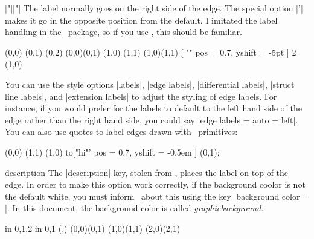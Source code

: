\begin{sseqdata}[name = basic, cohomological Serre grading]
\begin{manualentry}{|"||"|}
The label normally goes on the right side of the edge. The special option |'|
makes it go in the opposite position from the default. I imitated the label
handling in the \tikzcdpkg\ package, so if you use \tikzcdpkg, this should be
familiar.
\begin{codeexample}[width = 6cm]
\begin{sseqpage}[ Adams grading, yscale = 0.63 ]
\class(0,0)
\class(0,1)
\class(0,2)
\structline["a"' blue](0,0)(0,1)
\class(1,0)
\class(1,1)
\structline["b"](1,0)(1,1)
\d[ "" { pos = 0.7, yshift = -5pt } ] 2 (1,0)
\end{sseqpage}
\end{codeexample}
You can use the style options |labels|, |edge labels|, |differential labels|,
|struct line labels|, and |extension labels| to adjust the styling of edge labels. For instance, if
you would prefer for the labels to default to the left hand side of the edge
rather than the right hand side, you could say |edge labels = {auto = left}|.
You can also use quotes to label edges drawn with \tikzpkg\ primitives:
\begin{codeexample}[width = 6cm]
\begin{sseqpage}[ yscale = 0.58, no axes ]
\class(0,0)
\class(1,1)
\draw (1,0) to["hi"'{ pos = 0.7, yshift = -0.5em }] (0,1);
\end{sseqpage}
\end{codeexample}

\begin{key}{description}
The |description| key, stolen from \tikzcdpkg, places the label on top of the
edge. In order to make this option work correctly, if the background coolor is
not the default white, you must inform \sseqpages\ about this using the key
|background color = |. In this document, the background color is
called \textit{graphicbackground}.
\begin{codeexample}[width = 6cm]
\begin{sseqpage}[ no axes, background color = graphicbackground ]
\foreach \x in {0,1,2} \foreach \y in {0,1} {
    \class(\x,\y)
}
\structline["a" red](0,0)(0,1)
\structline["a'"'blue,"b"{yshift = 1em}](1,0)(1,1)
\structline["c" description](2,0)(2,1)
\end{sseqpage}
\end{codeexample}
\end{key}
\end{manualentry}




\end{sseqdata}

